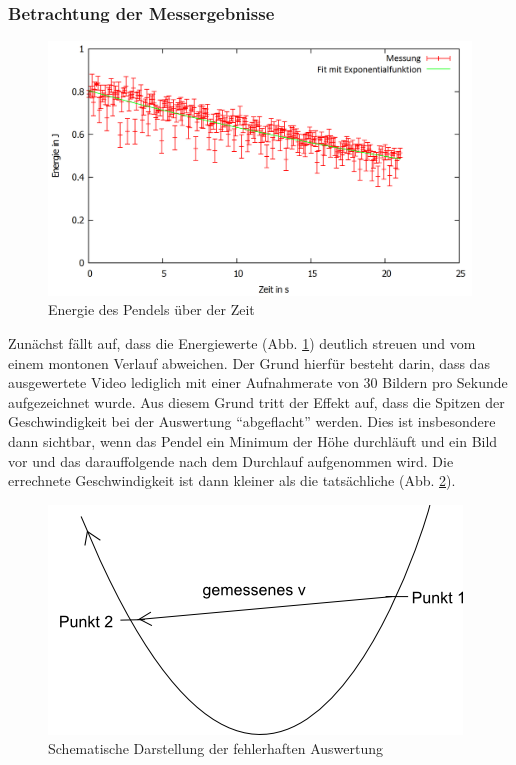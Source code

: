 \subsubsection{Betrachtung der Messergebnisse}


\begin{figure}
        \includegraphics[width=.9\textwidth]{images/E_ueber_t_neu.png}
\caption{Energie des Pendels über der Zeit}
\label{E_ueber_t}
\end{figure}

Zunächst fällt auf, dass die Energiewerte (Abb. \ref{E_ueber_t}) deutlich streuen und vom einem montonen Verlauf abweichen. Der Grund hierfür besteht darin, dass das ausgewertete Video lediglich mit einer Aufnahmerate von 30 Bildern pro Sekunde aufgezeichnet wurde. Aus diesem Grund tritt der Effekt auf, dass die Spitzen der Geschwindigkeit bei der Auswertung \enquote{abgeflacht} werden. Dies ist insbesondere dann sichtbar, wenn das Pendel ein Minimum der Höhe durchläuft und ein Bild vor und das darauffolgende nach dem Durchlauf aufgenommen wird. Die errechnete Geschwindigkeit ist dann kleiner als die tatsächliche (Abb. \ref{grafik1}). 

\begin{figure}
        \includegraphics[width=.7\textwidth]{images/grafik1.png}
\caption{Schematische Darstellung der fehlerhaften Auswertung}
\label{grafik1}
\end{figure}


